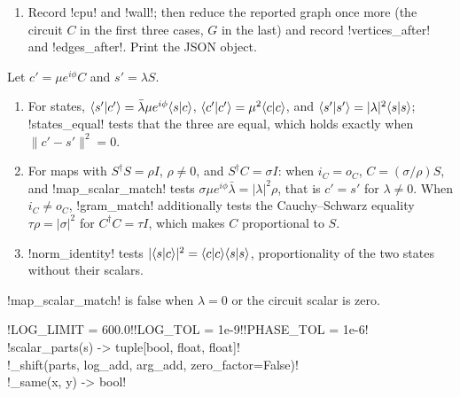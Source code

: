 \begin{algorithm}[ZX check]
\begin{enumerate}
\begin{enumerate}
  \item Otherwise \code!equal_up_to_scalar! is \py!gram_match(sigma, rho, tau)! when $L$ was computed and true otherwise; the verdict is \code!equal! when that holds and \py!map_scalar_match(sigma, rho, payload)! holds, else \code!unequal!. Here $\sigma,\rho,\tau$ are the scalars of $G$, $R$, and $L$.
  \end{enumerate}
  The graph whose size is reported becomes $G$.
\item Record \code!cpu! and \code!wall!; then reduce the reported graph once more (the circuit $C$ in the first three cases, $G$ in the last) and record \code!vertices_after! and \code!edges_after!. Print the JSON object.
\end{enumerate}
\end{algorithm}

\begin{proposition}\label{prop:bench-tools-zx-scalars}
Let $c'=\mu e^{i\phi}C$ and $s'=\lambda S$.
\begin{enumerate}
\item For states, $\langle s' \vert c' \rangle=\bar\lambda\mu e^{i\phi}\langle s \vert c \rangle$, $\langle c' \vert c' \rangle=\mu^2\langle c \vert c \rangle$, and $\langle s' \vert s' \rangle=|\lambda|^2\langle s \vert s \rangle$; \py!states_equal! tests that the three are equal, which holds exactly when $\lVert c'-s'\rVert^2=0$.
\item For maps with $S^\dagger S=\rho I$, $\rho\neq0$, and $S^\dagger C=\sigma I$: when $i_C=o_C$, $C=(\sigma/\rho)S$, and \py!map_scalar_match! tests $\sigma\mu e^{i\phi}\bar\lambda=|\lambda|^2\rho$, that is $c'=s'$ for $\lambda\neq0$. When $i_C\neq o_C$, \py!gram_match! additionally tests the Cauchy--Schwarz equality $\tau\rho=|\sigma|^2$ for $C^\dagger C=\tau I$, which makes $C$ proportional to $S$.
\item \py!norm_identity! tests $|\langle s \vert c \rangle|^2=\langle c \vert c \rangle\langle s \vert s \rangle$, proportionality of the two states without their scalars.
\end{enumerate}
\py!map_scalar_match! is false when $\lambda=0$ or the circuit scalar is zero.
\end{proposition}

\begin{signature}
\py!LOG_LIMIT = 600.0!\quad\py!LOG_TOL = 1e-9!\quad\py!PHASE_TOL = 1e-6!\\
\py!scalar_parts(s) -> tuple[bool, float, float]!\\
\py!_shift(parts, log_add, arg_add, zero_factor=False)!\\
\py!_same(x, y) -> bool!
\end{signature}

